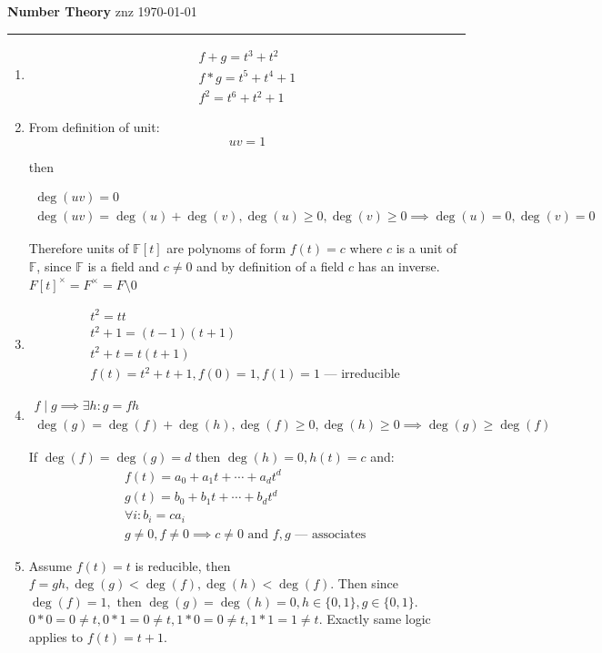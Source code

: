\documentclass[12pt]{article}
\begin{document}
\noindent
{\large\bfseries Number Theory}
\hfill
znz
\quad
\today

\hrule
\medskip

\begin{enumerate}
  \item
        \[
        \begin{gathered}
        f + g = t^3 + t^2 \\
        f * g = t^5 + t^4 + 1 \\
        f^2 = t^6 + t^2 + 1
        \end{gathered}
        \]
  \item
        From definition of unit:
        \[
        uv=1
        \]

        then

        \[
        \begin{gathered}
          \deg(uv)=0 \\
          \deg(uv) = \deg(u) + \deg(v), \deg(u) \geq 0, \deg(v) \geq 0 \implies \deg(u) = 0, \deg(v) = 0
        \end{gathered}
        \]

        Therefore units of $\mathbb{F}[t]$ are polynoms of form $f(t) = c$ where $c$ is a unit of $\mathbb{F}$, since $\mathbb{F}$ is a field and $c \neq 0$ and by definition of a field $c$ has an inverse. ${F[t]}^{\times}=F^{\times}=F \setminus {0}$
  \item
        \[
        \begin{gathered}
          t^2 = tt\\
          t^2 + 1 = (t - 1)(t + 1)\\
          t^2 + t = t(t + 1) \\
          f(t) = t^2 + t + 1, f(0)=1, f(1)=1  \text{ --- irreducible }
        \end{gathered}
        \]
  \item
        \[
        \begin{gathered}
        f \mid g \implies \exists h \colon g=fh \\
        \deg(g)=\deg(f) + \deg(h), \deg(f) \geq 0, \deg(h) \geq 0 \implies \deg(g) \geq \deg(f)
        \end{gathered}
        \]

        If $\deg(f) = \deg(g) = d$ then $\deg(h) = 0, h(t)=c$ and:
        \[
        \begin{gathered}
          f(t) = a_0 + a_1t + \cdots + a_{d}{t^d} \\
          g(t) = b_0 + b_1t + \cdots + b_{d}{t^d} \\
          \forall i: b_i = ca_i \\
          g \neq 0, f \neq 0 \implies c \neq 0 \text{ and } f, g \text{ --- associates }
        \end{gathered}
        \]
  \item
        Assume $f(t) = t$ is reducible, then $f=gh, \deg(g) < \deg(f), \deg(h) < \deg(f)$. Then since $\deg(f) = 1, \text{ then } \deg(g) = \deg(h) = 0, h \in \{0, 1\}, g \in \{0, 1\}$. $0 * 0 = 0 \neq t, 0 * 1 = 0 \neq t, 1 * 0 = 0 \neq t, 1 * 1 = 1 \neq t$. Exactly same logic applies to $f(t) = t + 1$.


\end{enumerate}
\end{document}
